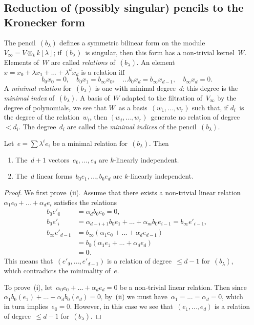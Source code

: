 \documentclass{lms}%
\begin{document}
\subsection{Reduction of (possibly singular) pencils to the Kronecker form} %
The pencil~$(b_{λ})$ defines a symmetric bilinear form on the
module~$V_{∞} = V ⊗_{k} k[λ]$; if $(b_{λ})$~is singular, then this form
has a non-trivial kernel~$W$. Elements of~$W$ are called \emph{relations}
of~$(b_{λ})$. An element~$x = x_0 + λ x_1 + … + λ^d x_d$ is a
relation iff
\begin{equation}\label{eq:relation}
b_0 x_0 = 0, \quad
b_0 x_1 = b_{∞} x_0, \quad …
b_0 x_d = b_{∞} x_{d-1}, \quad
b_{∞} x_{d} = 0.
\end{equation}
A \emph{minimal relation} for~$(b_{λ})$ is one with minimal degree~$d$;
this degree is the \emph{minimal index} of~$(b_{λ})$. A basis
of~$W$ adapted to the filtration of~$V_{∞}$ by the degree of polynomials,
we see that $W$~as a basis~$(w_1,…,w_r)$ such that, if $d_i$~is the
degree of the relation~$w_i$, then $(w_i,…,w_r)$~generate no relation of
degree~$< d_i$. The degree~$d_i$ are called the \emph{minimal indices} of
the pencil~$(b_{λ})$.
\begin{prop}\label{prop:minimal-indep}%
Let~$e = ∑ λ^i e_i$ be a minimal relation for~$(b_{λ})$. Then
\begin{enumerate}
\item The~$d+1$ vectors~$e_0, …, e_d$ are $k$-linearly independent.
\item The~$d$ linear forms~$b_{0} e_1, …, b_{0} e_d$ are $k$-linearly
independent.
\end{enumerate}
\end{prop}

\begin{proof}
We first prove~(ii). Assume that there exists a non-trivial linear
relation~$α_1 e_0 + … + α_d e_{i}$ satisfies the relations
\begin{equation}\label{eq:relation-e'}
\begin{split}
b_0 e'_0 &= α_d b_0 e_0 = 0, \\
b_0 e'_i &= α_{d-i+1} b_0 e_1 + … + α_m b_0 e_{i-1} = b_{∞} e'_{i-1}, \\
b_{∞} e'_{d-1} &= b_{∞} (α_1 e_{0} + … + α_{d} e_{d-1}) \\
 &= b_{0} (α_1 e_{1} + … + α_{d} e_{d}) \\
 &= 0.
\end{split}
\end{equation}
This means that~$(e'_0,…,e'_{d-1})$ is a relation of degree~$≤ d-1$
for~$(b_{λ})$, which contradicts the minimality of~$e$.

To prove~(i), let~$α_0 e_0 + … + α_d e_d = 0$ be a non-trivial linear
relation. Then since $α_1 b_0(e_1) + … + α_d b_0(e_d) = 0$, by~(ii) we
must have~$α_1 = … = α_d = 0$, which in turn implies~$e_0 = 0$. However,
in this case we see that~$(e_1,…,e_d)$ is a relation of degree~$≤ d-1$
for~$(b_{λ})$.
\end{proof}
\end{document}

